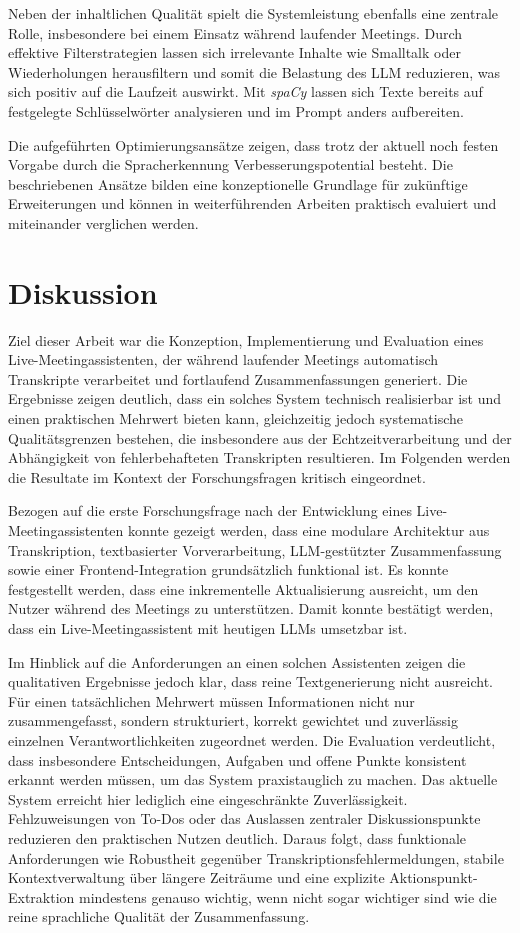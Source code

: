 Neben der inhaltlichen Qualität spielt die Systemleistung ebenfalls eine zentrale Rolle, insbesondere bei einem Einsatz während laufender Meetings. 
Durch effektive Filterstrategien lassen sich irrelevante Inhalte wie Smalltalk oder Wiederholungen herausfiltern und somit die Belastung des LLM reduzieren, was sich positiv auf die Laufzeit auswirkt. Mit \textit{spaCy} lassen sich Texte bereits auf festgelegte Schlüsselwörter analysieren und im Prompt anders aufbereiten. 

Die aufgeführten Optimierungsansätze zeigen, dass trotz der aktuell noch festen Vorgabe durch die Spracherkennung Verbesserungspotential besteht. Die beschriebenen Ansätze bilden eine konzeptionelle Grundlage für zukünftige Erweiterungen und können in weiterführenden Arbeiten praktisch evaluiert und miteinander verglichen werden.

\chapter{Diskussion}
Ziel dieser Arbeit war die Konzeption, Implementierung und Evaluation eines Live-Meetingassistenten, der während laufender Meetings automatisch Transkripte verarbeitet und fortlaufend Zusammenfassungen generiert. Die Ergebnisse zeigen deutlich, dass ein solches System technisch realisierbar ist und einen praktischen Mehrwert bieten kann, gleichzeitig jedoch systematische Qualitätsgrenzen bestehen, die insbesondere aus der Echtzeitverarbeitung und der Abhängigkeit von fehlerbehafteten Transkripten resultieren. Im Folgenden werden die Resultate im Kontext der Forschungsfragen kritisch eingeordnet.

Bezogen auf die erste Forschungsfrage nach der Entwicklung eines Live-Meetingassistenten konnte gezeigt werden, dass eine modulare Architektur aus Transkription, textbasierter Vorverarbeitung, LLM-gestützter Zusammenfassung sowie einer Frontend-Integration grundsätzlich funktional ist.  Es konnte festgestellt werden, dass eine inkrementelle Aktualisierung ausreicht, um den Nutzer während des Meetings zu unterstützen. Damit konnte bestätigt werden, dass ein Live-Meetingassistent mit heutigen LLMs umsetzbar ist.

Im Hinblick auf die Anforderungen an einen solchen Assistenten zeigen die qualitativen Ergebnisse jedoch klar, dass reine Textgenerierung nicht ausreicht. Für einen tatsächlichen Mehrwert müssen Informationen nicht nur zusammengefasst, sondern strukturiert, korrekt gewichtet und zuverlässig einzelnen Verantwortlichkeiten zugeordnet werden. Die Evaluation verdeutlicht, dass insbesondere Entscheidungen, Aufgaben und offene Punkte konsistent erkannt werden müssen, um das System praxistauglich zu machen. Das aktuelle System erreicht hier lediglich eine eingeschränkte Zuverlässigkeit. Fehlzuweisungen von To-Dos oder das Auslassen zentraler Diskussionspunkte reduzieren den praktischen Nutzen deutlich. Daraus folgt, dass funktionale Anforderungen wie Robustheit gegenüber Transkriptionsfehlermeldungen, stabile Kontextverwaltung über längere Zeiträume und eine explizite Aktionspunkt-Extraktion mindestens genauso wichtig, wenn nicht sogar wichtiger sind wie die reine sprachliche Qualität der Zusammenfassung.

